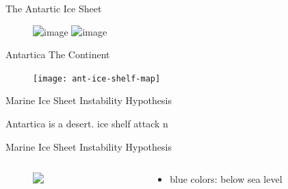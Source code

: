 \documentclass[hide notes,intlimits]{beamer}
\begin{document}
\begin{frame}{The Antartic Ice Sheet}
  \begin{figure}
    \includegraphics<1>[width=\textwidth]{ice-sheet-cartoon-simple}
    \includegraphics<2>[width=\textwidth]{ice-sheet-cartoon-simple-box}
  \end{figure}
\end{frame}


\begin{frame}{Antartica The Continent}
  \begin{figure}
    \texttt{[image: ant-ice-shelf-map]}
  \end{figure}
\end{frame}


\begin{frame}{Marine Ice Sheet Instability Hypothesis}
 \begin{figure}
  \end{figure}
  Antartica is a desert. ice shelf attack
  n
\end{frame}


\begin{frame}{Marine Ice Sheet Instability Hypothesis}
  \begin{columns}[c]
    \begin{column}{.65\linewidth}
      \begin{figure}
        \includegraphics<1>[height=8cm]{ant-marine}
      \end{figure}
    \end{column}
    \begin{column}{.38\linewidth}
      \begin{itemize}
      \item blue colors: below sea level
      \end{itemize}
    \end{column}
  \end{columns}
\end{frame}
\end{document}
